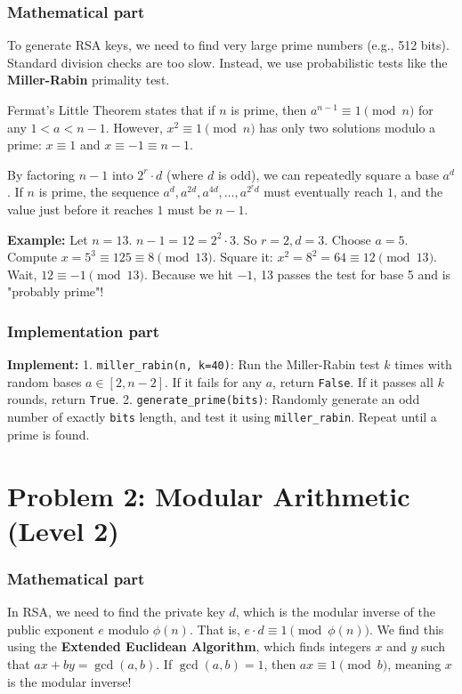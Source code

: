 \documentclass[11pt]{article}
\begin{document}
\subsubsection*{Mathematical part}
To generate RSA keys, we need to find very large prime numbers (e.g., 512 bits). Standard division checks are too slow. Instead, we use probabilistic tests like the \textbf{Miller-Rabin} primality test.

Fermat's Little Theorem states that if $n$ is prime, then $a^{n-1} \equiv 1 \pmod{n}$ for any $1 < a < n-1$. 
However, $x^2 \equiv 1 \pmod n$ has only two solutions modulo a prime: $x \equiv 1$ and $x \equiv -1 \equiv n-1$. 

By factoring $n-1$ into $2^r \cdot d$ (where $d$ is odd), we can repeatedly square a base $a^d$. 
If $n$ is prime, the sequence $a^d, a^{2d}, a^{4d}, \dots, a^{2^r d}$ must eventually reach $1$, and the value just before it reaches $1$ must be $n-1$.

\textbf{Example:} Let $n = 13$. $n-1 = 12 = 2^2 \cdot 3$. So $r = 2, d = 3$. 
Choose $a = 5$. Compute $x = 5^3 \equiv 125 \equiv 8 \pmod{13}$.
Square it: $x^2 = 8^2 = 64 \equiv 12 \pmod{13}$. Wait, $12 \equiv -1 \pmod{13}$. 
Because we hit $-1$, 13 passes the test for base 5 and is "probably prime"!

\subsubsection*{Implementation part}
\textbf{Implement:} 
1. \lstinline|miller_rabin(n, k=40)|: Run the Miller-Rabin test $k$ times with random bases $a \in [2, n-2]$. If it fails for any $a$, return \lstinline|False|. If it passes all $k$ rounds, return \lstinline|True|.
2. \lstinline|generate_prime(bits)|: Randomly generate an odd number of exactly \lstinline|bits| length, and test it using \lstinline|miller_rabin|. Repeat until a prime is found.


\section*{Problem 2: Modular Arithmetic (Level 2)}

\subsubsection*{Mathematical part}
In RSA, we need to find the private key $d$, which is the modular inverse of the public exponent $e$ modulo $\phi(n)$. That is, $e \cdot d \equiv 1 \pmod{\phi(n)}$.
We find this using the \textbf{Extended Euclidean Algorithm}, which finds integers $x$ and $y$ such that $ax + by = \gcd(a, b)$. If $\gcd(a, b) = 1$, then $ax \equiv 1 \pmod b$, meaning $x$ is the modular inverse!
\end{document}

